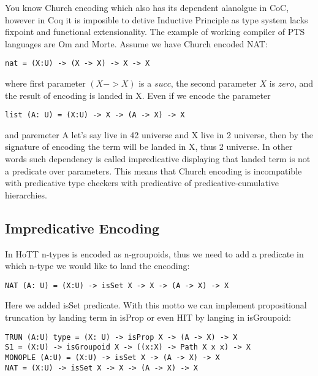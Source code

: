 \documentclass{article}
\theoremstyle{definition}
\begin{document}
You know Church encoding which also has its dependent alanolgue in CoC, however
in Coq it is imposible to detive Inductive Principle as type system lacks fixpoint
and functional extensionality. The example of working compiler of PTS languages are Om and Morte.
Assume we have Church encoded NAT:

\begin{lstlisting}[mathescape=true]
nat = (X:U) -> (X -> X) -> X -> X
\end{lstlisting}

where first parameter $(X -> X)$ is a $succ$, the second parameter $X$ is $zero$,
and the result of encoding is landed in X. Even if we encode the parameter

\begin{lstlisting}[mathescape=true]
list (A: U) = (X:U) -> X -> (A -> X) -> X
\end{lstlisting}

and paremeter A let's say live in 42 universe and X live in 2 universe, then by
the signature of encoding the term will be landed in X, thus 2 universe. In other words
such dependency is called impredicative displaying that landed term is not a predicate over parameters.
This means that Church encoding is incompatible with predicative type checkers with predicative
of predicative-cumulative hierarchies.

\subsection{Impredicative Encoding}

In HoTT n-types is encoded as n-groupoids, thus we need to add a predicate in which n-type
we would like to land the encoding:

\begin{lstlisting}[mathescape=true]
NAT (A: U) = (X:U) -> isSet X -> X -> (A -> X) -> X
\end{lstlisting}

Here we added isSet predicate. With this motto we can implement propositional
truncation by landing term in isProp or even HIT by langing in isGroupoid:

\begin{lstlisting}[mathescape=true]
TRUN (A:U) type = (X: U) -> isProp X -> (A -> X) -> X
S1 = (X:U) -> isGroupoid X -> ((x:X) -> Path X x x) -> X
MONOPLE (A:U) = (X:U) -> isSet X -> (A -> X) -> X
NAT = (X:U) -> isSet X -> X -> (A -> X) -> X
\end{lstlisting}
\end{document}
